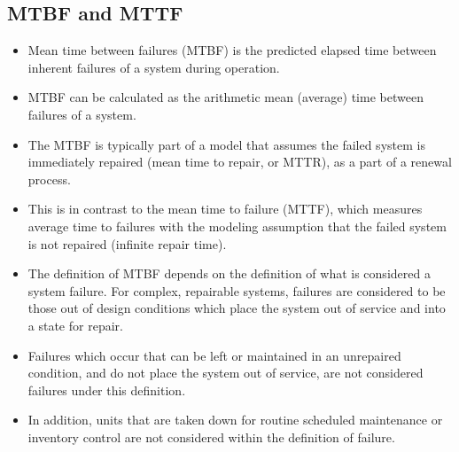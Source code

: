 \subsection*{MTBF and MTTF}

\begin{itemize}
\item Mean time between failures (MTBF) is the predicted elapsed time between inherent failures of a system during operation.
\item MTBF can be calculated as the arithmetic mean (average) time between failures of a system.
\item The MTBF is typically part of a model that assumes the failed system is immediately repaired (mean time to repair, or MTTR), as a part of a renewal process. 
\item This is in contrast to the mean time to failure (MTTF), which measures average time to failures with the modeling assumption that the failed system is not repaired (infinite repair time).
\item The definition of MTBF depends on the definition of what is considered a system failure. For complex, repairable systems, failures are considered to be those out of design conditions which place the system out of service and into a state for repair. 
\item Failures which occur that can be left or maintained in an unrepaired condition, and do not place the system out of service, are not considered failures under this definition.
\item In addition, units that are taken down for routine scheduled maintenance or inventory control are not considered within the definition of failure.

\end{itemize}